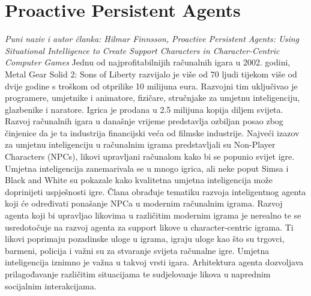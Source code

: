 \documentclass[a4paper,12pt]{foi}
\begin{document}
\section{Proactive Persistent Agents}
\emph{Puni naziv i autor članka: Hilmar Finnsson, Proactive Persistent Agents: Using Situational Intelligence to Create Support Characters in Character-Centric Computer Games} \citep{NameeB2004}
\newline
Jednu od najprofitabilnijih računalnih igara u 2002. godini, Metal Gear Solid 2: Sons of Liberty razvijalo je više od 70 ljudi tijekom više od dvije godine s troškom od otprilike 10 milijuna eura. Razvojni tim uključivao je programere, umjetnike i animatore, fizičare, stručnjake za umjetnu inteligenciju, glazbenike i naratore. Igrica je prodana u 2.5 milijuna kopija diljem svijeta. Razvoj računalnih igara u današnje vrijeme predstavlja ozbiljan posao zbog činjenice da je ta industrija financijski veća od filmske industrije. Najveći izazov za umjetnu inteligenciju u računalnim igrama predstavljali su Non-Player Characters (NPCs), likovi upravljani računalom kako bi se popunio svijet igre. Umjetna inteligencija zanemarivala se u mnogo igrica, ali neke poput Simsa i Black and White su pokazale kako kvalitetna umjetna inteligencija može doprinijeti uspješnosti igre.
Člana obrađuje tematiku razvoja inteligentnog agenta koji će određivati ponašanje NPCa u modernim računalnim igrama. Razvoj agenta koji bi upravljao likovima u različitim modernim igrama je nerealno te se usredotočuje na razvoj agenta za support likove u character-centric igrama. Ti likovi poprimaju pozadinske uloge u igrama, igraju uloge kao što su trgovci, barmeni, policija i važni su za stvaranje svijeta računalne igre. Umjetna inteligencija iznimno je važna u takvoj vrsti igara. Arhitektura agenta dozvoljava prilagođavanje različitim situacijama te sudjelovanje likova u naprednim socijalnim interakcijama.
\end{document}
